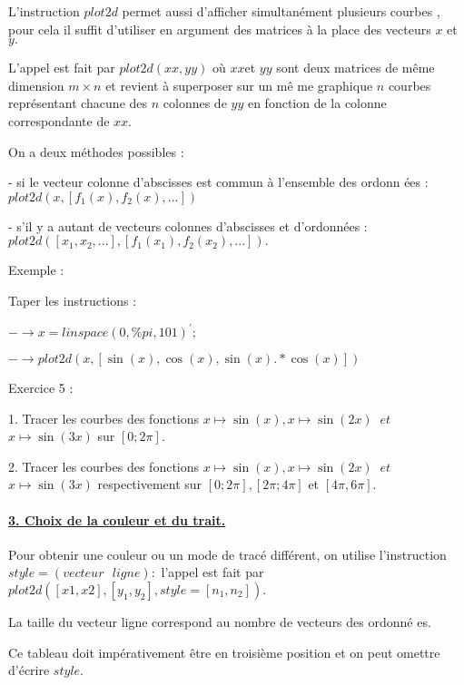 \documentclass{article}
\begin{document}
L'instruction $plot2d$ permet aussi d'afficher simultan\'{e}ment plusieurs
courbes , pour cela il suffit d'utiliser en argument des matrices \`{a} la
place des vecteurs $x$ et $y.$

L'appel est fait par $plot2d(xx,yy)$ o\`{u} $xx$et $yy$ sont deux matrices
de m\^{e}me dimension $m\times n$ et revient \`{a} superposer sur un m\^{e}%
me graphique $n$ courbes repr\'{e}sentant chacune des $n$ colonnes de $yy$
en fonction de la colonne correspondante de $xx.$

On a deux m\'{e}thodes possibles :

- si le vecteur colonne d'abscisses est commun \`{a} l'ensemble des ordonn%
\'{e}es : $plot2d(x,\left[ f_{1}(x),f_{2}(x),...\right] )$

- s'il y a autant de vecteurs colonnes d'abscisses et d'ordonn\'{e}es : $%
plot2d(\left[ x_{1},x_{2},...\right] ,\left[ f_{1}(x_{1}),f_{2}(x_{2}),...%
\right] ).$

Exemple :

Taper les instructions :

$-\rightarrow x=linspace(0,\%pi,101)^{\prime };$

$-\rightarrow plot2d(x,[\sin (x),\cos (x),\sin (x).\ast \cos (x)])$

Exercice 5 :

1. Tracer les courbes des fonctions $x\mapsto \sin (x),x\mapsto \sin (2x)$ $%
\ et$ $x\mapsto \sin (3x)$ sur $\left[ 0;2\pi \right] .$

2. Tracer les courbes des fonctions $x\mapsto \sin (x),x\mapsto \sin (2x)$ $%
\ et$ $x\mapsto \sin (3x)$ respectivement sur $\left[ 0;2\pi \right] ,\left[
2\pi ;4\pi \right] $ et $\left[ 4\pi ,6\pi \right] .$

\bigskip

\paragraph{\protect\underline{3. Choix de la couleur et du trait.}}

Pour obtenir une couleur ou un mode de trac\'{e} diff\'{e}rent, on utilise
l'instruction $style=\left( vecteur\text{ }ligne\right) :$ l'appel est fait
par $plot2d(\left[ x1,x2\right] ,\left[ y_{1},y_{2}\right] ,style=\left[
n_{1},n_{2}\right] ).$

La taille du vecteur ligne correspond au nombre de vecteurs des ordonn\'{e}%
es.

Ce tableau doit imp\'{e}rativement \^{e}tre en troisi\`{e}me position et on
peut omettre d'\'{e}crire $style$.
\end{document}
